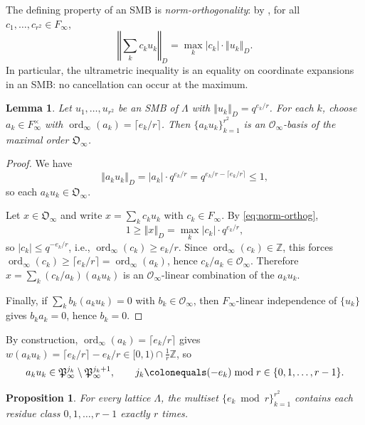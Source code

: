 \documentclass[12pt]{amsart}
\newtheorem{prop}[thm]{Proposition}
\newtheorem{lem}[thm]{Lemma}
\theoremstyle{definition}
\theoremstyle{remark}
\numberwithin{equation}{section}
\numberwithin{thm}{section}
\DeclareMathOperator{\ord}{ord}
\newcommand{\fO}{\mathfrak{O}}
\newcommand{\fP}{\mathfrak{P}}
\newcommand{\cO}{\mathcal{O}}
\newcommand{\Z}{\mathbb{Z}}
\newcommand{\Fi}{F_\infty}
\newcommand{\La}{\Lambda}
\newcommand{\norm}[1]{\left\Vert#1\right\Vert}
\newcommand{\abs}[1]{\left|#1\right|}
\begin{document}
	The defining property of an SMB is \emph{norm-orthogonality}: by \cite[Lem.~4.2]{Taguchi}, for all $c_1, \ldots, c_{r^2} \in \Fi$,
	\begin{equation}\label{eq:norm-orthog}
		\norm{\sum_k c_k u_k}_D = \max_k \abs{c_k}\cdot \norm{u_k}_D.
	\end{equation}
	In particular, the ultrametric inequality is an equality on coordinate expansions in an SMB: no cancellation can occur at the maximum.
	
	\begin{lem}\label{lem:scaled-SMB-basis}
		Let $u_1, \ldots, u_{r^2}$ be an SMB of $\La$ with $\norm{u_k}_D = q^{e_k/r}$. For each $k$, choose $a_k \in \Fi^\times$ with $\ord_\infty(a_k) = \lceil e_k/r \rceil$. Then $\{a_k u_k\}_{k=1}^{r^2}$ is an $\cO_\infty$-basis of the maximal order $\fO_\infty$.
	\end{lem}
	
	\begin{proof}
		We have
		\[
		\norm{a_k u_k}_D = \abs{a_k}\cdot q^{e_k/r} = q^{e_k/r - \lceil e_k/r \rceil} \leq 1,
		\]
		so each $a_k u_k \in \fO_\infty$.
		
		Let $x \in \fO_\infty$ and write $x = \sum_k c_k u_k$ with $c_k \in \Fi$. By \eqref{eq:norm-orthog},
		\[
		1 \geq \norm{x}_D = \max_k \abs{c_k}\cdot q^{e_k/r},
		\]
		so $\abs{c_k} \leq q^{-e_k/r}$, i.e., $\ord_\infty(c_k) \geq e_k/r$. Since $\ord_\infty(c_k) \in \Z$, this forces $\ord_\infty(c_k) \geq \lceil e_k/r \rceil = \ord_\infty(a_k)$, hence $c_k/a_k \in \cO_\infty$. Therefore $x = \sum_k (c_k/a_k)(a_k u_k)$ is an $\cO_\infty$-linear combination of the $a_k u_k$.
		
		Finally, if $\sum_k b_k (a_k u_k) = 0$ with $b_k \in \cO_\infty$, then $\Fi$-linear independence of $\{u_k\}$ gives $b_k a_k = 0$, hence $b_k = 0$.
	\end{proof}
	
	By construction, $\ord_\infty(a_k) = \lceil e_k/r \rceil$ gives $w(a_k u_k) = \lceil e_k/r \rceil - e_k/r \in [0,1)\cap \tfrac{1}{r}\Z$, so
	\[
	a_k u_k \in \fP_\infty^{j_k} \setminus \fP_\infty^{j_k+1}, \qquad j_k \colonequals (-e_k) \bmod r \in \{0, 1, \ldots, r-1\}.
	\]
	
	\begin{prop}\label{prop:uniform-residues}
		For every lattice $\La$, the multiset $\{e_k \bmod r\}_{k=1}^{r^2}$ contains each residue class $0, 1, \ldots, r-1$ exactly $r$ times.
	\end{prop}
	
\end{document}
